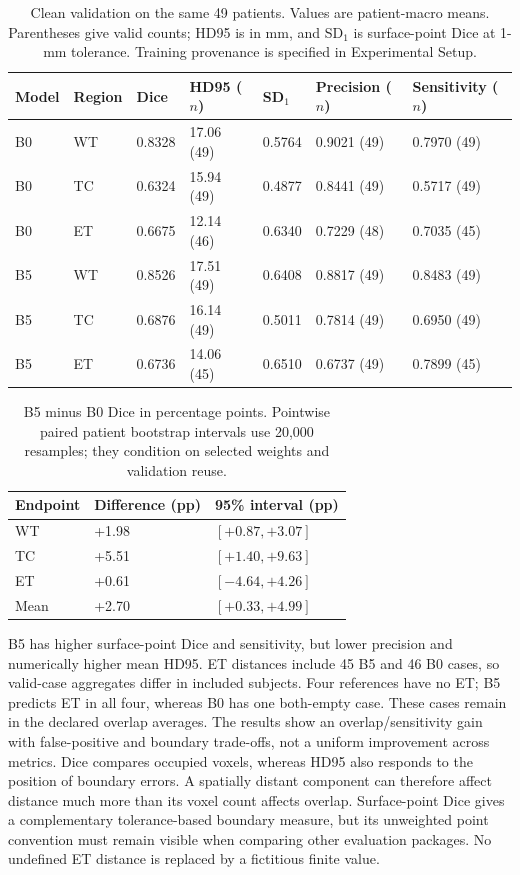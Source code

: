 \documentclass[conference]{IEEEtran}
\begin{document}
\begin{table}[!t]
\caption{Clean validation on the same 49 patients. Values are patient-macro means. Parentheses give valid counts; HD95 is in mm, and SD$_1$ is surface-point Dice at 1-mm tolerance. Training provenance is specified in Experimental Setup.}
\label{tab:results}
\centering
\begin{tabularx}{\textwidth}{@{}l l L L L L L@{}}
\toprule
Model & Region & Dice & HD95 ($n$) & SD$_1$ & Precision ($n$) & Sensitivity ($n$) \\
\midrule
B0 & WT & 0.8328 & 17.06 (49) & 0.5764 & 0.9021 (49) & 0.7970 (49) \\
B0 & TC & 0.6324 & 15.94 (49) & 0.4877 & 0.8441 (49) & 0.5717 (49) \\
B0 & ET & 0.6675 & 12.14 (46) & 0.6340 & 0.7229 (48) & 0.7035 (45) \\
B5 & WT & 0.8526 & 17.51 (49) & 0.6408 & 0.8817 (49) & 0.8483 (49) \\
B5 & TC & 0.6876 & 16.14 (49) & 0.5011 & 0.7814 (49) & 0.6950 (49) \\
B5 & ET & 0.6736 & 14.06 (45) & 0.6510 & 0.6737 (49) & 0.7899 (45) \\
\bottomrule
\end{tabularx}
\end{table}

\begin{table}[!t]
\caption{B5 minus B0 Dice in percentage points. Pointwise paired patient bootstrap intervals use 20,000 resamples; they condition on selected weights and validation reuse.}
\label{tab:paired}
\centering
\begin{tabularx}{\columnwidth}{@{}l L L@{}}
\toprule
Endpoint & Difference (pp) & 95\% interval (pp) \\
\midrule
WT & +1.98 & $[+0.87, +3.07]$ \\
TC & +5.51 & $[+1.40, +9.63]$ \\
ET & +0.61 & $[-4.64, +4.26]$ \\
Mean & +2.70 & $[+0.33, +4.99]$ \\
\bottomrule
\end{tabularx}
\end{table}

B5 has higher surface-point Dice and sensitivity, but lower precision and numerically higher mean HD95. ET distances include 45 B5 and 46 B0 cases, so valid-case aggregates differ in included subjects. Four references have no ET; B5 predicts ET in all four, whereas B0 has one both-empty case. These cases remain in the declared overlap averages. The results show an overlap/sensitivity gain with false-positive and boundary trade-offs, not a uniform improvement across metrics. Dice compares occupied voxels, whereas HD95 also responds to the position of boundary errors. A spatially distant component can therefore affect distance much more than its voxel count affects overlap. Surface-point Dice gives a complementary tolerance-based boundary measure, but its unweighted point convention must remain visible when comparing other evaluation packages. No undefined ET distance is replaced by a fictitious finite value.
\end{document}
